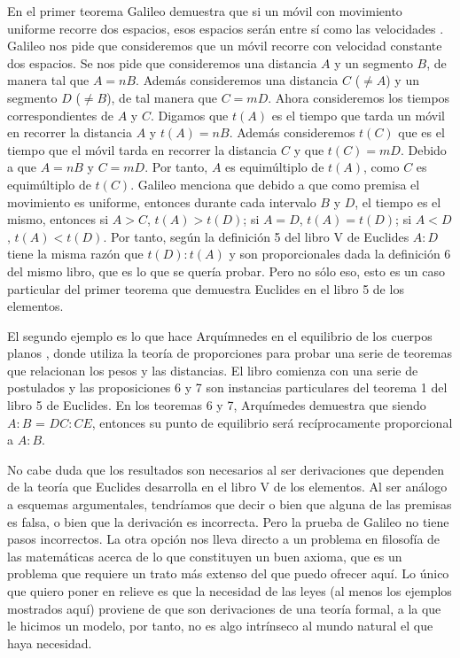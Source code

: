 En el primer teorema Galileo demuestra que si un móvil con movimiento uniforme recorre dos espacios, esos espacios serán entre sí como las velocidades \cite[p. 215]{galtre}. Galileo nos pide que consideremos que un móvil recorre con velocidad constante dos espacios. Se nos pide que consideremos una distancia $A$ y un segmento $B$, de manera tal que $A = nB$. Además consideremos una distancia $C$ ($\neq A$) y un segmento $D$ ($\neq B$), de tal manera que $C = mD$. Ahora consideremos los tiempos correspondientes de $A$ y $C$. Digamos que $t(A)$ es el tiempo que tarda un móvil en recorrer la distancia $A$ y $t(A) = nB$. Además consideremos $t(C)$ que es el tiempo que el móvil tarda en recorrer la distancia $C$ y que $t(C) = mD$. Debido a que  $A = nB$ y $C = mD$. Por tanto, $A$ es equimúltiplo de $t(A)$, como $C$ es equimúltiplo de $t(C)$. Galileo menciona que debido a que como premisa el movimiento es uniforme, entonces durante cada intervalo $B$ y $D$, el tiempo es el mismo, entonces si $A > C$, $t(A) > t(D)$; si $A = D$, $t(A) = t(D)$; si $A < D$, $t(A) < t(D)$. Por tanto, según la definición 5 del libro V de Euclides \cite{Euclid2008} $A:D$ tiene la misma razón que $t(D):t(A)$ y son proporcionales dada la definición 6 del mismo libro, que es lo que se quería probar. Pero no sólo eso, esto es un caso particular del primer teorema que demuestra Euclides en el libro 5 de los elementos.%

El segundo ejemplo es lo que hace Arquímnedes en el equilibrio de los cuerpos planos \cite{Archimedes1897}, donde utiliza la teoría de proporciones para probar una serie de teoremas que relacionan los pesos y las distancias. El libro comienza con una serie de postulados y las proposiciones 6 y 7 son instancias particulares del teorema 1 del libro 5 de Euclides. En los teoremas 6 y 7, Arquímedes demuestra que siendo $A:B$ = $DC:CE$, entonces su punto de equilibrio será recíprocamente proporcional a $A:B$.

No cabe duda que los resultados son necesarios al ser derivaciones que dependen de la teoría que Euclides desarrolla en el libro V de los elementos. Al ser análogo a esquemas argumentales, tendríamos que decir o bien que alguna de las premisas es falsa, o bien que la derivación es incorrecta. Pero la prueba de Galileo no tiene pasos incorrectos. La otra opción nos lleva directo a un problema en filosofía de las matemáticas acerca de lo que constituyen un buen axioma, que es un problema que requiere un trato más extenso del que puedo ofrecer aquí. Lo único que quiero poner en relieve es que la necesidad de las leyes (al menos los ejemplos mostrados aquí) proviene de que son derivaciones de una teoría formal, a la que le hicimos un modelo, por tanto, no es algo intrínseco al mundo natural el que haya necesidad.

